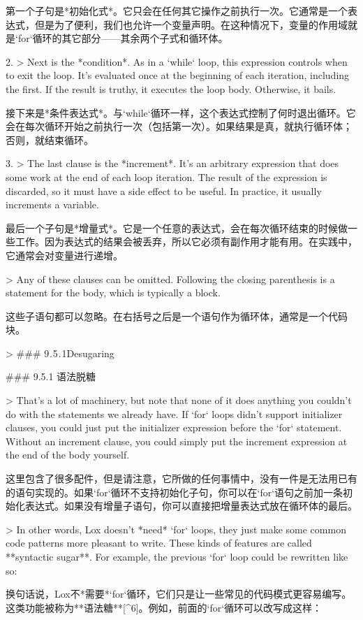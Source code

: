 \documentclass[cn,11pt,chinese]{elegantbook}
\begin{document}
{{{{   第一个子句是*初始化式*。它只会在任何其它操作之前执行一次。它通常是一个表达式，但是为了便利，我们也允许一个变量声明。在这种情况下，变量的作用域就是`for`循环的其它部分——其余两个子式和循环体。

2. > Next is the *condition*. As in a `while` loop, this expression controls when to exit the loop. It’s evaluated once at the beginning of each iteration, including the first. If the result is truthy, it executes the loop body. Otherwise, it bails.

   接下来是*条件表达式*。与`while`循环一样，这个表达式控制了何时退出循环。它会在每次循环开始之前执行一次（包括第一次）。如果结果是真，就执行循环体；否则，就结束循环。

3. > The last clause is the *increment*. It’s an arbitrary expression that does some work at the end of each loop iteration. The result of the expression is discarded, so it must have a side effect to be useful. In practice, it usually increments a variable.

   最后一个子句是*增量式*。它是一个任意的表达式，会在每次循环结束的时候做一些工作。因为表达式的结果会被丢弃，所以它必须有副作用才能有用。在实践中，它通常会对变量进行递增。

> Any of these clauses can be omitted. Following the closing parenthesis is a statement for the body, which is typically a block.

这些子语句都可以忽略。在右括号之后是一个语句作为循环体，通常是一个代码块。

> ### 9 . 5 . 1Desugaring

### 9.5.1 语法脱糖

> That’s a lot of machinery, but note that none of it does anything you couldn’t do with the statements we already have. If `for` loops didn’t support initializer clauses, you could just put the initializer expression before the `for` statement. Without an increment clause, you could simply put the increment expression at the end of the body yourself.

这里包含了很多配件，但是请注意，它所做的任何事情中，没有一件是无法用已有的语句实现的。如果`for`循环不支持初始化子句，你可以在`for`语句之前加一条初始化表达式。如果没有增量子语句，你可以直接把增量表达式放在循环体的最后。

> In other words, Lox doesn’t *need* `for` loops, they just make some common code patterns more pleasant to write. These kinds of features are called **syntactic sugar**. For example, the previous `for` loop could be rewritten like so:

换句话说，Lox不*需要*`for`循环，它们只是让一些常见的代码模式更容易编写。这类功能被称为**语法糖**[^6]。例如，前面的`for`循环可以改写成这样：

}}}}
\end{document}
